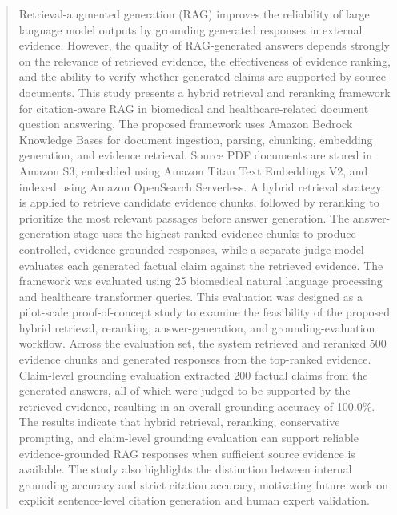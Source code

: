 \documentclass[conference]{IEEEtran}
\begin{document}
\maketitle
\begin{abstract}
Retrieval-augmented generation (RAG) improves the reliability of large language model outputs by grounding generated responses in external evidence. However, the quality of RAG-generated answers depends strongly on the relevance of retrieved evidence, the effectiveness of evidence ranking, and the ability to verify whether generated claims are supported by source documents. This study presents a hybrid retrieval and reranking framework for citation-aware RAG in biomedical and healthcare-related document question answering. The proposed framework uses Amazon Bedrock Knowledge Bases for document ingestion, parsing, chunking, embedding generation, and evidence retrieval. Source PDF documents are stored in Amazon S3, embedded using Amazon Titan Text Embeddings V2, and indexed using Amazon OpenSearch Serverless. A hybrid retrieval strategy is applied to retrieve candidate evidence chunks, followed by reranking to prioritize the most relevant passages before answer generation. The answer-generation stage uses the highest-ranked evidence chunks to produce controlled, evidence-grounded responses, while a separate judge model evaluates each generated factual claim against the retrieved evidence. The framework was evaluated using 25 biomedical natural language processing and healthcare transformer queries. This evaluation was designed as a pilot-scale proof-of-concept study to examine the feasibility of the proposed hybrid retrieval, reranking, answer-generation, and grounding-evaluation workflow. Across the evaluation set, the system retrieved and reranked 500 evidence chunks and generated responses from the top-ranked evidence. Claim-level grounding evaluation extracted 200 factual claims from the generated answers, all of which were judged to be supported by the retrieved evidence, resulting in an overall grounding accuracy of 100.0\%. The results indicate that hybrid retrieval, reranking, conservative prompting, and claim-level grounding evaluation can support reliable evidence-grounded RAG responses when sufficient source evidence is available. The study also highlights the distinction between internal grounding accuracy and strict citation accuracy, motivating future work on explicit sentence-level citation generation and human expert validation.
\end{abstract}
\end{document}
